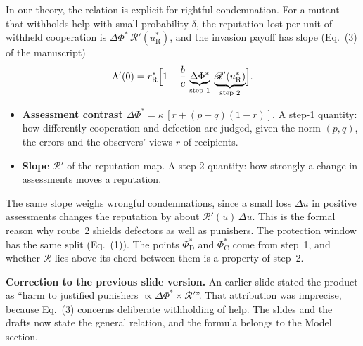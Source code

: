 \documentclass[11pt]{article}
\newcommand{\Rmap}{\mathscr{R}}
\begin{document}
In our theory, the relation is explicit for rightful condemnation. For a mutant that withholds help with small probability $\delta$, the reputation lost per unit of withheld cooperation is $\Delta\Phi^*\,\Rmap'(u_{\mathrm R}^*)$, and the invasion payoff has slope (Eq.~(3) of the manuscript)
\[
\Lambda'(0)=r_{\mathrm R}^*\Bigl[1-\frac{b}{c}\,\underbrace{\Delta\Phi^*}_{\text{step 1}}\;\underbrace{\Rmap'(u_{\mathrm R}^*)}_{\text{step 2}}\Bigr].
\]
\begin{itemize}[leftmargin=1.2em]
\item \textbf{Assessment contrast} $\Delta\Phi^*=\kappa\,[r+(p-q)(1-r)]$. A step-1 quantity: how differently cooperation and defection are judged, given the norm $(p,q)$, the errors and the observers' views $r$ of recipients.
\item \textbf{Slope} $\Rmap'$ of the reputation map. A step-2 quantity: how strongly a change in assessments moves a reputation.
\end{itemize}
The same slope weighs wrongful condemnations, since a small loss $\Delta u$ in positive assessments changes the reputation by about $\Rmap'(u)\,\Delta u$. This is the formal reason why route~2 shields defectors as well as punishers. The protection window has the same split (Eq.~(1)). The points $\Phi^*_{\mathrm D}$ and $\Phi^*_{\mathrm C}$ come from step~1, and whether $\Rmap$ lies above its chord between them is a property of step~2.

\textbf{Correction to the previous slide version.} An earlier slide stated the product as ``harm to justified punishers $\propto \Delta\Phi^*\times\Rmap'$''. That attribution was imprecise, because Eq.~(3) concerns deliberate withholding of help. The slides and the drafts now state the general relation, and the formula belongs to the Model section.
\end{document}
